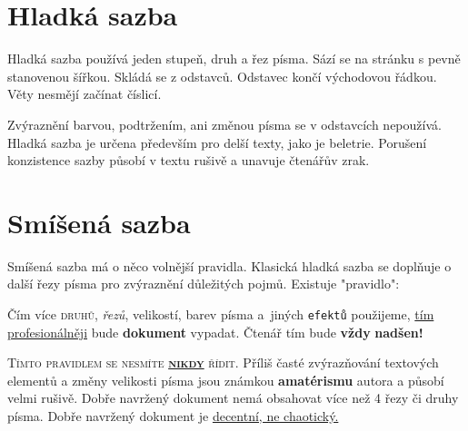 \documentclass[a4paper, 10pt, twocolumn]{article}
\newlength{\normalheight}
\newlength{\overflowheight}
\begin{document}
\ifdim\pagegoal<\overflowheight
  \setlength{\textheight}{\normalheight}
\else
  \setlength{\textheight}{\overflowheight}
\fi



\section{Hladká sazba}
Hladká sazba používá jeden stupeň, druh a řez písma.
Sází se na stránku s pevně stanovenou šířkou.
Skládá se z odstavců. Odstavec končí východovou řádkou.
Věty nesmějí začínat číslicí.

Zvýraznění barvou, podtržením, ani změnou písma se v odstavcích nepoužívá.
Hladká sazba je určena především pro delší texty, jako je beletrie.
Porušení konzistence sazby působí v textu rušivě a unavuje čtenářův zrak.

\section{Smíšená sazba}
Smíšená sazba má o něco volnější pravidla.
Klasická hladká sazba se doplňuje o další řezy písma pro zvýraznění důležitých pojmů.
Existuje "pravidlo":

\begin{adjustwidth}{0.77cm}{0.80cm}
    \medskip
    \setlength{\parindent}{0.5cm}
    \hspace{\parindent}
    Čím více \textsc{druhů}, \emph{řezů}, {\scriptsize velikostí}, {\color{red}barev} pí\-sma a~jiných \verb|efektů| použijeme,
    \underline{tím profesionálněji} bude \textbf{\selectfont dokument} vypadat. Čtenář tím bude {\textbf{{\LARGE vždy}}} {\textbf{{\LARGE nadšen!}}}
    \medskip
\end{adjustwidth}

\textsc{Tímto pravidlem se nesmíte \underline{\textbf{nikdy}} řídit.}
Příliš časté zvýrazňování textových elementů a změny {\tiny velikosti} písma jsou známkou {\textbf{amatérismu}} autora a působí velmi rušivě.
Dobře navržený dokument nemá obsahovat více než 4 řezy či druhy písma.
Dobře navržený dokument je \underline{decentní, ne chaotický.}
\end{document}

